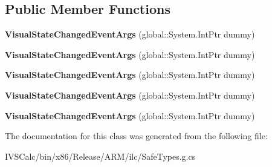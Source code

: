 \subsection*{Public Member Functions}
\begin{DoxyCompactItemize}
\item 
\mbox{\label{class_windows_1_1_u_i_1_1_xaml_1_1_visual_state_changed_event_args_a6f570c1130ca7f4fddb265739cf615c1}} 
{\bfseries Visual\+State\+Changed\+Event\+Args} (global\+::\+System.\+Int\+Ptr dummy)
\item 
\mbox{\label{class_windows_1_1_u_i_1_1_xaml_1_1_visual_state_changed_event_args_a6f570c1130ca7f4fddb265739cf615c1}} 
{\bfseries Visual\+State\+Changed\+Event\+Args} (global\+::\+System.\+Int\+Ptr dummy)
\item 
\mbox{\label{class_windows_1_1_u_i_1_1_xaml_1_1_visual_state_changed_event_args_a6f570c1130ca7f4fddb265739cf615c1}} 
{\bfseries Visual\+State\+Changed\+Event\+Args} (global\+::\+System.\+Int\+Ptr dummy)
\item 
\mbox{\label{class_windows_1_1_u_i_1_1_xaml_1_1_visual_state_changed_event_args_a6f570c1130ca7f4fddb265739cf615c1}} 
{\bfseries Visual\+State\+Changed\+Event\+Args} (global\+::\+System.\+Int\+Ptr dummy)
\item 
\mbox{\label{class_windows_1_1_u_i_1_1_xaml_1_1_visual_state_changed_event_args_a6f570c1130ca7f4fddb265739cf615c1}} 
{\bfseries Visual\+State\+Changed\+Event\+Args} (global\+::\+System.\+Int\+Ptr dummy)
\end{DoxyCompactItemize}


The documentation for this class was generated from the following file\+:\begin{DoxyCompactItemize}
\item 
I\+V\+S\+Calc/bin/x86/\+Release/\+A\+R\+M/ilc/Safe\+Types.\+g.\+cs\end{DoxyCompactItemize}
